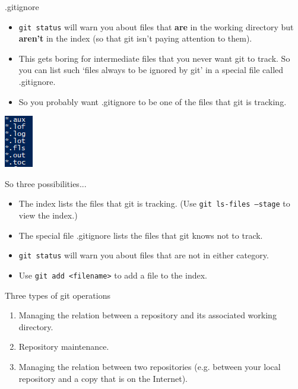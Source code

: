 \documentclass[usenames,dvipsnames]{beamer}
\newcommand{\code}[1]{\colorbox{light-gray}{\texttt{#1}}}
\begin{document}
\begin{frame}{.gitignore}
  \begin{block}{}
    \begin{itemize}
      \item{\code{git status} will warn you about files that \textbf{are} in the working directory but \textbf{aren't} in the index (so that git isn't paying attention to them).}
      \item{This gets boring for intermediate files that you never want git to track. So you can list such `files always to be ignored by git' in a special file called .gitignore.}
      \item{So you probably want .gitignore to be one of the files that git is tracking.}
    \end{itemize}
  \end{block}
  \begin{block}{}
    \begin{center}
      \includegraphics[scale=0.8]{gitignore.png}
    \end{center}
  \end{block}
\end{frame}

\begin{frame}{So three possibilities...}
  \begin{block}{}
    \begin{itemize}
      \item{The index lists the files that git is tracking. (Use \code{git ls-files --stage} to view the index.)}
      \item{The special file .gitignore lists the files that git knows not to track.}
      \item{\code{git status} will warn you about files that are not in either category.}
      \item{Use \code{git add <filename>} to add a file to the index.}
    \end{itemize}
  \end{block}
\end{frame}


\begin{frame}{Three types of git operations}
  \begin{block}{}
    \begin{enumerate}
      \item{Managing the relation between a repository and its associated working directory.}
      \item{Repository maintenance.}
      \item{Managing the relation between two repositories (e.g. between your local repository and a copy that is on the Internet).}
    \end{enumerate}
  \end{block}
\end{frame}
\end{document}
